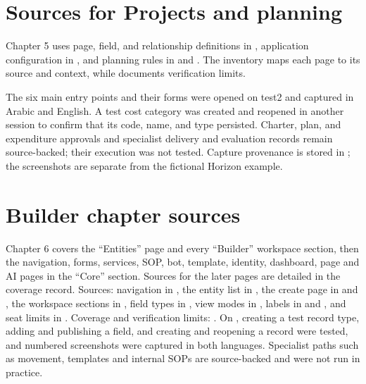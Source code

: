 \section{Sources for Projects and planning}
\label{sec:sources-projects}
Chapter 5 uses page, field, and relationship definitions in , application configuration in , and planning rules in  and . The  inventory maps each page to its source and context, while  documents verification limits.

The six main entry points and their forms were opened on test2 and captured in Arabic and English. A test cost category was created and reopened in another session to confirm that its code, name, and type persisted. Charter, plan, and expenditure approvals and specialist delivery and evaluation records remain source-backed; their execution was not tested. Capture provenance is stored in ; the screenshots are separate from the fictional Horizon example.

\section{Builder chapter sources}
\label{sec:sources-builder}
Chapter 6 covers the “Entities” page and every “Builder” workspace section, then the navigation, forms, services, SOP, bot, template, identity, dashboard, page and AI pages in the “Core” section. Sources for the later pages are detailed in the coverage record. Sources: navigation in , the entity list in , the create page in  and , the workspace sections in , field types in , view modes in , labels in  and , and seat limits in . Coverage and verification limits: .
On , creating a test record type, adding and publishing a field, and creating and reopening a record were tested, and numbered screenshots were captured in both languages. Specialist paths such as movement, templates and internal SOPs are source-backed and were not run in practice.

